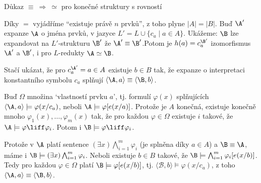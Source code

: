 \documentclass{beamer}
\begin{document}
\begin{frame}{Důkaz $\equiv\ \Rightarrow\ \simeq$ pro konečné struktury s rovností}
    
    \pause
    \vspace{-6pt}
    Díky $=$ vyjádříme ``existuje právě $n$ prvků'', z toho plyne \alert{$|A|=|B|$}. \pause 
    Buď $\A'$ expanze $\A$ o jména prvků, v jazyce $L'=L\cup\{c_a\mid a\in A\}$. Ukážeme: $\B$ \alert{lze expandovat} na $L'$-strukturu $\B'$ \alert{že $\A'\equiv \B'$}.\pause Potom je \alert{$h(a)= c_a^{\B'}$} izomorfismus $\A'$ a $\B'$, i pro $L$-redukty $\A\simeq\B$. \pause
    
    Stačí ukázat, že \alert{pro $c_a^{\A'}=a\in A$ existuje $b\in B$} tak, že expanze o interpretaci konstantního symbolu $c_a$ splňují \alert{$\langle \A,a\rangle\equiv\langle\B,b\rangle$}. \pause 
    
    Buď $\Omega$ množina `\alert{vlastností prvku $a$}', \pause tj. formulí $\varphi(x)$ splňujících $\langle \A,a\rangle \models \varphi(x/c_a)$, neboli $\A\models \varphi[e(x/a)]$. \pause Protože je $A$ konečná, existuje \alert{konečně mnoho $\varphi_1(x),\dots,\varphi_m(x)$} tak, že pro každou $\varphi \in \Omega$ existuje $i$ takové, že $\A\models \varphi\liff\varphi_i$. \pause Potom i $\B\models\varphi\liff\varphi_i$. %
    
    \pause
    Protože v $\A$ platí sentence \alert{$(\exists x)\bigwedge_{i=1}^m\varphi_i$} (je splněna díky $a\in A$) a $\B\equiv\A$, máme i $\B\models (\exists x)\bigwedge_{i=1}^m\varphi_i$. \pause Neboli existuje $b\in B$ takové, že $\B\models \bigwedge_{i=1}^m\varphi_i[e(x/b)]$. \pause Tedy pro každou $\varphi\in \Omega$ platí $\B\models \varphi[e(x/b)]$, tj. $\langle\mathcal{B},b\rangle\models \varphi(x/c_a)$, z toho $\langle \A,a\rangle\equiv\langle\B,b\rangle$.\hfill\qedsymbol

\end{frame}
\end{document}
